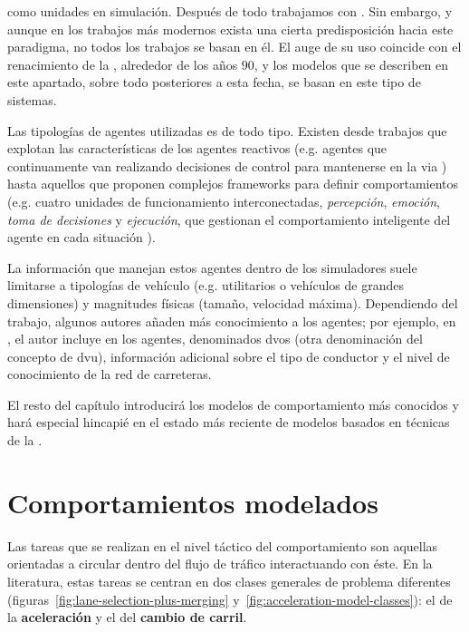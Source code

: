  como unidades en simulación. Después de todo trabajamos con . Sin embargo, y aunque en los trabajos más modernos exista una cierta predisposición hacia este paradigma, no todos los trabajos se basan en él. El auge de su uso coincide con el renacimiento de la , alrededor de los años $90$, y los modelos que se describen en este apartado, sobre todo posteriores a esta fecha, se basan en este tipo de sistemas.

Las tipologías de agentes utilizadas es de todo tipo. Existen desde trabajos que explotan las características de los agentes reactivos (e.g. agentes que continuamente van realizando decisiones de control para mantenerse en la via \cite{Ehlert2001}) hasta aquellos que proponen complejos frameworks para definir comportamientos (e.g. cuatro unidades de funcionamiento interconectadas, \textit{percepción}, \textit{emoción}, \textit{toma de decisiones} y \textit{ejecución}, que gestionan el comportamiento inteligente del agente en cada situación \cite{al2001framework}).

La información que manejan estos agentes dentro de los simuladores suele limitarse a tipologías de vehículo (e.g. utilitarios o vehículos de grandes dimensiones) y magnitudes físicas (tamaño, velocidad máxima). Dependiendo del trabajo, algunos autores añaden más conocimiento a los agentes; por ejemplo, en \cite{hidas2002}, el autor incluye en los agentes, denominados \glspl{dvo} (otra denominación del concepto de \gls{dvu}), información adicional sobre el tipo de conductor y el nivel de conocimiento de la red de carreteras.

El resto del capítulo introducirá los modelos de comportamiento más conocidos y hará especial hincapié en el estado más reciente de modelos basados en técnicas de la .

\section{Comportamientos modelados}

Las tareas que se realizan en el nivel táctico del comportamiento son aquellas orientadas a circular dentro del flujo de tráfico interactuando con éste. En la literatura, estas tareas se centran en dos clases generales de problema diferentes (figuras~\ref{fig:lane-selection-plus-merging} y~\ref{fig:acceleration-model-classes}): el de la \textbf{aceleración} y el del \textbf{cambio de carril}.

